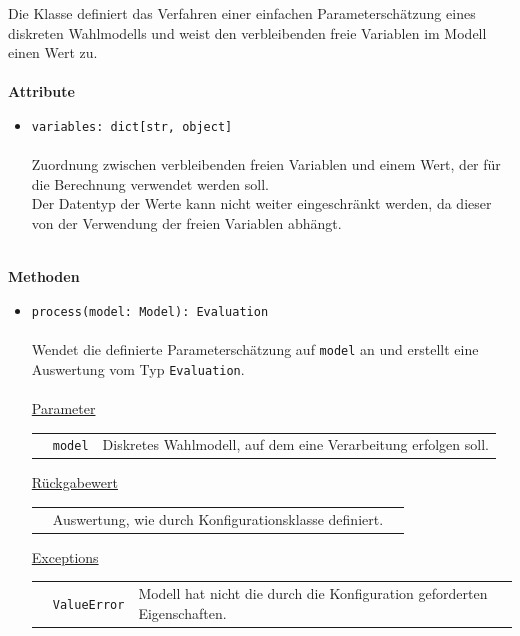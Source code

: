 \documentclass{article}
\begin{document}
Die Klasse definiert das Verfahren einer einfachen Parameterschätzung eines diskreten Wahlmodells und weist den verbleibenden freie Variablen im Modell einen Wert zu.
\\\\

\textbf{Attribute}
\begin{itemize}\setlength\itemsep{3em}
\item \texttt{variables: dict[str, object]}\\\\
Zuordnung zwischen verbleibenden freien Variablen und einem Wert, der für die Berechnung verwendet werden soll.\\
Der Datentyp der Werte kann nicht weiter eingeschränkt werden, da dieser von der Verwendung der freien Variablen abhängt.
\\\\
\end{itemize}

\textbf{Methoden}
\begin{itemize}\setlength\itemsep{3em}
\item \texttt{process(model: Model): Evaluation}\\\\
Wendet die definierte Parameterschätzung auf \texttt{model} an und erstellt eine Auswertung vom Typ \texttt{Evaluation}.
\\\\
\underline{Parameter}\\
\begin{tabular}{lll}
 & \texttt{model} & Diskretes Wahlmodell, auf dem eine Verarbeitung erfolgen soll.\\
\end{tabular}

\underline{Rückgabewert}\\
\begin{tabular}{lll}
 & Auswertung, wie durch Konfigurationsklasse definiert.\\
\end{tabular}

\underline{Exceptions}\\
\begin{tabular}{lll}
 & \texttt{ValueError} & Modell hat nicht die durch die Konfiguration geforderten Eigenschaften.\\
\end{tabular}
\end{itemize}

\newpage
\end{document}
